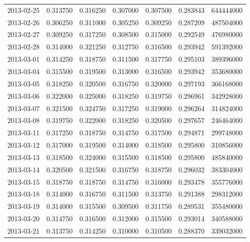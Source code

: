 \begin{tabular}{lrrrrrr}
2013-02-25 &    0.313750 &    0.316250 &    0.307000 &    0.307500 &    0.283843 &   644444000 \\
2013-02-26 &    0.306250 &    0.311000 &    0.305250 &    0.309250 &    0.287209 &   487504000 \\
2013-02-27 &    0.309250 &    0.317250 &    0.308500 &    0.315000 &    0.292549 &   476980000 \\
2013-02-28 &    0.314000 &    0.321250 &    0.312750 &    0.316500 &    0.293942 &   591392000 \\
2013-03-01 &    0.314250 &    0.318750 &    0.311500 &    0.317750 &    0.295103 &   389396000 \\
2013-03-04 &    0.315500 &    0.319500 &    0.313000 &    0.316500 &    0.293942 &   353680000 \\
2013-03-05 &    0.318250 &    0.320500 &    0.316750 &    0.320000 &    0.297193 &   366168000 \\
2013-03-06 &    0.322000 &    0.325000 &    0.318250 &    0.319750 &    0.296961 &   342928000 \\
2013-03-07 &    0.321500 &    0.324750 &    0.317250 &    0.319000 &    0.296264 &   314824000 \\
2013-03-08 &    0.319750 &    0.322000 &    0.318250 &    0.320500 &    0.297657 &   246464000 \\
2013-03-11 &    0.317250 &    0.318750 &    0.314750 &    0.317500 &    0.294871 &   299748000 \\
2013-03-12 &    0.317000 &    0.319500 &    0.314000 &    0.318500 &    0.295800 &   310856000 \\
2013-03-13 &    0.318500 &    0.324000 &    0.315500 &    0.318500 &    0.295800 &   485840000 \\
2013-03-14 &    0.320500 &    0.321500 &    0.316750 &    0.318750 &    0.296032 &   383304000 \\
2013-03-15 &    0.318750 &    0.318750 &    0.314750 &    0.316000 &    0.293478 &   355776000 \\
2013-03-18 &    0.314000 &    0.316750 &    0.311500 &    0.313750 &    0.291388 &   298312000 \\
2013-03-19 &    0.314000 &    0.315500 &    0.309500 &    0.311750 &    0.289531 &   355480000 \\
2013-03-20 &    0.314750 &    0.316500 &    0.312000 &    0.315500 &    0.293014 &   340588000 \\
2013-03-21 &    0.313750 &    0.314250 &    0.310000 &    0.310500 &    0.288370 &   339032000 \\

\end{tabular}
